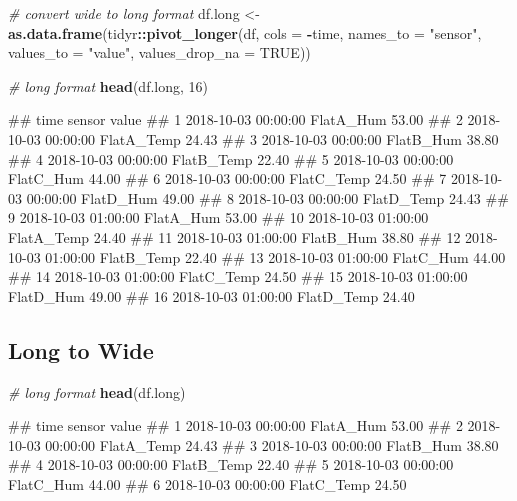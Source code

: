 \documentclass[
  a4paperpaper,
]{book}
\newenvironment{Shaded}{\begin{snugshade}}{\end{snugshade}}
\newcommand{\CommentTok}[1]{\textcolor[rgb]{0.56,0.35,0.01}{\textit{#1}}}
\newcommand{\DataTypeTok}[1]{\textcolor[rgb]{0.13,0.29,0.53}{#1}}
\newcommand{\DecValTok}[1]{\textcolor[rgb]{0.00,0.00,0.81}{#1}}
\newcommand{\KeywordTok}[1]{\textcolor[rgb]{0.13,0.29,0.53}{\textbf{#1}}}
\newcommand{\NormalTok}[1]{#1}
\newcommand{\OperatorTok}[1]{\textcolor[rgb]{0.81,0.36,0.00}{\textbf{#1}}}
\newcommand{\OtherTok}[1]{\textcolor[rgb]{0.56,0.35,0.01}{#1}}
\newcommand{\StringTok}[1]{\textcolor[rgb]{0.31,0.60,0.02}{#1}}
\let\oldShaded\Shaded
\let\endoldShaded\endShaded
\renewenvironment{Shaded}{\footnotesize\oldShaded}{\endoldShaded}
\let\oldverbatim\verbatim
\let\endoldverbatim\endverbatim
\renewenvironment{verbatim}{\footnotesize\oldverbatim}{\endoldverbatim}
\begin{document}
\begin{Shaded}
\begin{Highlighting}[]
\CommentTok{# convert wide to long format}
\NormalTok{df.long <-}\StringTok{ }\KeywordTok{as.data.frame}\NormalTok{(tidyr}\OperatorTok{::}\KeywordTok{pivot_longer}\NormalTok{(df,}
                                             \DataTypeTok{cols =} \OperatorTok{-}\NormalTok{time,}
                                             \DataTypeTok{names_to =} \StringTok{"sensor"}\NormalTok{,}
                                             \DataTypeTok{values_to =} \StringTok{"value"}\NormalTok{,}
                                             \DataTypeTok{values_drop_na =} \OtherTok{TRUE}\NormalTok{))}

\CommentTok{# long format}
\KeywordTok{head}\NormalTok{(df.long, }\DecValTok{16}\NormalTok{)}
\end{Highlighting}
\end{Shaded}

\begin{verbatim}
##                   time     sensor value
## 1  2018-10-03 00:00:00  FlatA_Hum 53.00
## 2  2018-10-03 00:00:00 FlatA_Temp 24.43
## 3  2018-10-03 00:00:00  FlatB_Hum 38.80
## 4  2018-10-03 00:00:00 FlatB_Temp 22.40
## 5  2018-10-03 00:00:00  FlatC_Hum 44.00
## 6  2018-10-03 00:00:00 FlatC_Temp 24.50
## 7  2018-10-03 00:00:00  FlatD_Hum 49.00
## 8  2018-10-03 00:00:00 FlatD_Temp 24.43
## 9  2018-10-03 01:00:00  FlatA_Hum 53.00
## 10 2018-10-03 01:00:00 FlatA_Temp 24.40
## 11 2018-10-03 01:00:00  FlatB_Hum 38.80
## 12 2018-10-03 01:00:00 FlatB_Temp 22.40
## 13 2018-10-03 01:00:00  FlatC_Hum 44.00
## 14 2018-10-03 01:00:00 FlatC_Temp 24.50
## 15 2018-10-03 01:00:00  FlatD_Hum 49.00
## 16 2018-10-03 01:00:00 FlatD_Temp 24.40
\end{verbatim}

\newpage

\hypertarget{long-to-wide}{%
\subsection{Long to Wide}\label{long-to-wide}}

\begin{Shaded}
\begin{Highlighting}[]
\CommentTok{# long format}
\KeywordTok{head}\NormalTok{(df.long)}
\end{Highlighting}
\end{Shaded}

\begin{verbatim}
##                  time     sensor value
## 1 2018-10-03 00:00:00  FlatA_Hum 53.00
## 2 2018-10-03 00:00:00 FlatA_Temp 24.43
## 3 2018-10-03 00:00:00  FlatB_Hum 38.80
## 4 2018-10-03 00:00:00 FlatB_Temp 22.40
## 5 2018-10-03 00:00:00  FlatC_Hum 44.00
## 6 2018-10-03 00:00:00 FlatC_Temp 24.50
\end{verbatim}
\end{document}
